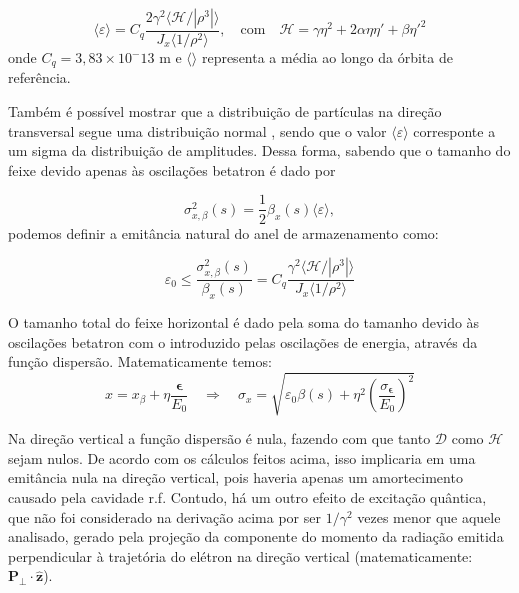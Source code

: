 \begin{equation}
 \langle\varepsilon\rangle = C_q\frac{2 \gamma^2 \langle
\mathcal{H}/|\rho^3|\rangle}{J_x\langle 1/\rho^2 \rangle} ,\quad \text{com}
\quad \mathcal{H}=  \gamma \eta^2 + 2 \alpha \eta \eta' + \beta \eta'^2
\end{equation}
onde $C_q = \mathrm{3,83 \times 10^-13}$ m e $\langle \rangle$ representa a média ao longo da órbita de referência.

Também é possível mostrar que a distribuição de partículas na direção transversal segue uma distribuição normal \cite{Lee}, sendo que o valor $\langle\varepsilon\rangle$ corresponte a um sigma da distribuição de
amplitudes. Dessa forma, sabendo que o tamanho do feixe devido apenas às oscilações betatron é dado por

\begin{equation}
 \sigma_{x,\beta}^2(s) = \frac{1}{2}\beta_x(s)\langle\varepsilon\rangle,
\end{equation}
podemos definir a emitância natural do anel de armazenamento como:

\begin{equation}\label{eqemitancia}
 \varepsilon_0 \leq \frac{\sigma_{x,\beta}^2(s)}{\beta_x(s)} =
C_q\frac{\gamma^2 \langle \mathcal{H}/|\rho^3|\rangle}{J_x\langle 1/\rho^2
\rangle}
\end{equation}

O tamanho total do feixe horizontal é dado pela soma do tamanho devido às oscilações betatron com o introduzido pelas oscilações de energia, através da função dispersão. Matematicamente temos:
\begin{equation}
 x = x_\beta + \eta\frac{\boldsymbol{\epsilon}}{E_0} \quad \Rightarrow \quad
\sigma_x = \sqrt{\varepsilon_0 \beta(s)
+\eta^2 \left(\frac{\sigma_{\boldsymbol{\epsilon}}}{E_0}\right)^2}
\end{equation}

Na direção vertical a função dispersão é nula, fazendo com que tanto $\mathcal{D}$ como $\mathcal{H}$ sejam nulos. De acordo com os cálculos feitos acima, isso implicaria em uma emitância nula na direção vertical, pois haveria apenas um amortecimento causado pela cavidade r.f. Contudo, há um outro efeito de excitação quântica, que não foi considerado na derivação acima por ser $1/\gamma^2$ vezes menor que aquele analisado, gerado pela projeção da componente do momento da radiação emitida perpendicular à trajetória do elétron na direção vertical (matematicamente: $\mathbf{P_\perp} \cdot \mathbf{\hat{z}}$). 

